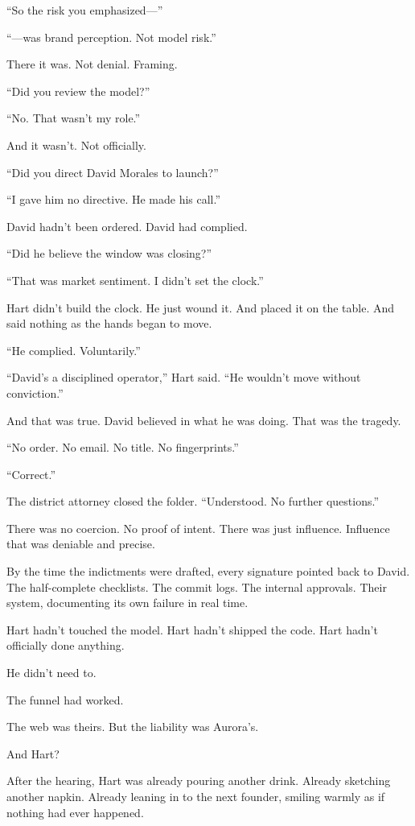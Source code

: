 “So the risk you emphasized—”

“—was brand perception. Not model risk.”

There it was.
Not denial. Framing.

“Did you review the model?”

“No. That wasn’t my role.”

And it wasn’t. Not officially.

“Did you direct David Morales to launch?”

“I gave him no directive. He made his call.”

David hadn’t been ordered.
David had complied.

“Did he believe the window was closing?”

“That was market sentiment. I didn’t set the clock.”

Hart didn’t build the clock. He just wound it.
And placed it on the table.
And said nothing as the hands began to move.

“He complied. Voluntarily.”

“David’s a disciplined operator,” Hart said. “He wouldn’t move without conviction.”

And that was true. David believed in what he was doing.
That was the tragedy.

“No order. No email. No title. No fingerprints.”

“Correct.”

The district attorney closed the folder.
“Understood. No further questions.”

There was no coercion. No proof of intent.
There was just influence.
Influence that was deniable and precise.

By the time the indictments were drafted, every signature pointed back to David.
The half-complete checklists.
The commit logs.
The internal approvals.
Their system, documenting its own failure in real time.

Hart hadn’t touched the model.
Hart hadn’t shipped the code.
Hart hadn’t officially done anything.

He didn’t need to.

The funnel had worked.

The web was theirs.
But the liability was Aurora’s.

And Hart?

After the hearing, Hart was already pouring another drink.
Already sketching another napkin.
Already leaning in to the next founder,
smiling warmly
as if nothing had ever happened.


